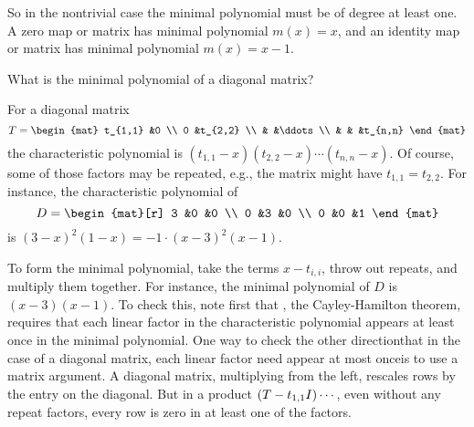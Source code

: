 \begin{exercises}
\begin{answer}
         So in the nontrivial case the minimal polynomial must be of degree
         at least one.
         A zero map or matrix has minimal polynomial \( m(x)=x \), and an
         identity map or matrix has minimal polynomial \( m(x)=x-1 \). 
       \end{answer}
   \recommended \item 
     What is the minimal polynomial of a diagonal matrix?
     \begin{answer}
       For a diagonal matrix
       \begin{equation*}
          T=
          \begin{mat}
             t_{1,1}   &0        \\
             0         &t_{2,2}  \\
                       &        &\ddots  \\
                       &        &      &t_{n,n}
          \end{mat}
       \end{equation*}
       the characteristic polynomial is 
       $(t_{1,1}-x)(t_{2,2}-x)\cdots (t_{n,n}-x)$.     
       Of course, some of those factors may be repeated, e.g., the matrix might
       have $t_{1,1}=t_{2,2}$.
       For instance, the characteristic polynomial of
       \begin{equation*}
          D=
          \begin{mat}[r]
             3 &0 &0  \\
             0 &3 &0  \\
             0 &0 &1
          \end{mat}
       \end{equation*}
       is \( (3-x)^2(1-x)=-1\cdot (x-3)^2(x-1) \). 

       To form the minimal polynomial, 
       take the terms \( x-t_{i,i} \), throw out repeats, 
       and multiply them together.
       For instance, the minimal polynomial of $D$
       is \( (x-3)(x-1) \).
       To check this, note first that , 
       the Cayley-Hamilton theorem, requires that each linear factor in the
       characteristic polynomial appears at least once in the minimal
       polynomial.
       One way to check the other direction\Dash that in the case of
       a diagonal matrix, 
       each linear factor need appear at most once\Dash is to
       use a matrix argument.
       A diagonal matrix, multiplying from the left, rescales rows by
       the entry on the diagonal.
       But in a product $(T-t_{1,1}I)\cdots\hbox{}$, even without any repeat
       factors, every row is zero in at least one of the factors. 


\end{answer}
\end{exercises}
